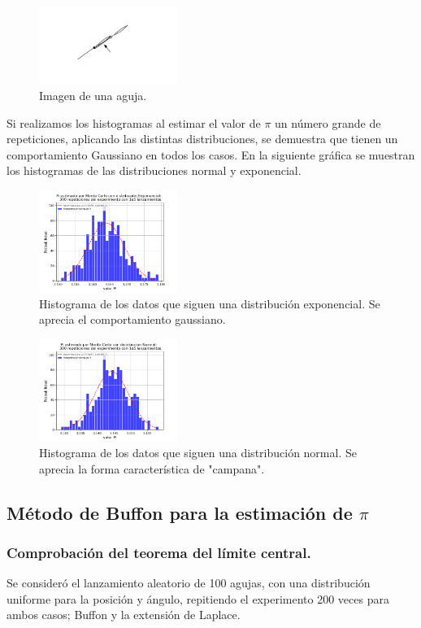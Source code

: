 \documentclass{rbf}
\begin{document}
\begin{figure}[h]
 \centering
  \includegraphics[width=0.4\textwidth]{figures/aguja.png}
	\caption{Imagen de una aguja.\cite{Statistics}}
 \label{buff7}
\end{figure}
Si realizamos los histogramas al estimar el valor de $\pi$ un número grande de repeticiones, aplicando las distintas distribuciones, se demuestra que tienen un comportamiento Gaussiano en todos los casos. En la siguiente gráfica se muestran los histogramas de las distribuciones normal y exponencial. 
\begin{figure}[tbp!]
 \centering
  \includegraphics[width=0.4\textwidth]{figures/MCdistExp.png}
	\caption{Histograma de los datos que siguen una distribución exponencial. Se aprecia el comportamiento gaussiano.}
 \label{buff8}
\end{figure}
\begin{figure}[h]
 \centering
  \includegraphics[width=0.4\textwidth]{figures/MCdistNorm.png}
	\caption{Histograma de los datos que siguen una distribución normal. Se aprecia la forma característica de "campana".}
 \label{buff9}
\end{figure}
\subsection{Método de Buffon para la estimación de $\pi$}
\subsubsection{Comprobación del teorema del límite central.}
Se consideró el lanzamiento aleatorio de 100 agujas, con una distribución uniforme para la posición y ángulo, repitiendo el experimento 200 veces para ambos casos; Buffon y la extensión de Laplace.
\end{document}
